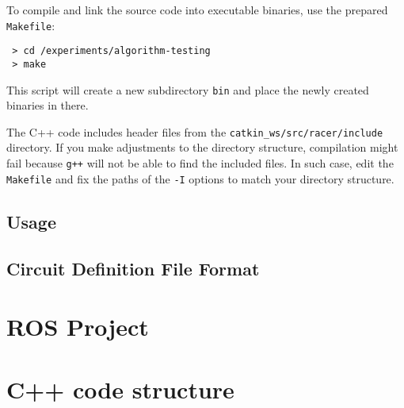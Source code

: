 To compile and link the source code into executable binaries, use the prepared \texttt{Makefile}:

\begin{verbatim}
 > cd /experiments/algorithm-testing
 > make
\end{verbatim}

This script will create a new subdirectory \texttt{bin} and place the newly created binaries in there.

The C++ code includes header files from the \texttt{catkin\_ws/src/racer/include} directory. If you make adjustments to the directory structure, compilation might fail because \texttt{g++} will not be able to find the included files. In such case, edit the \texttt{Makefile} and fix the paths of the \texttt{-I} options to match your directory structure.

\subsection{Usage}

\subsection{Circuit Definition File Format}

\section{ROS Project}

\section{C++ code structure}
